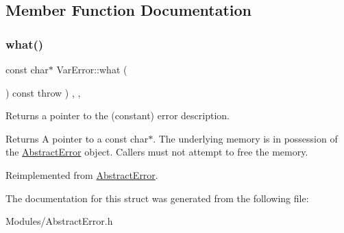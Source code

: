 \subsection{Member Function Documentation}
\mbox{\label{structVarError_a48ee904c5e61633cb6f4b9af2d093eaa}} 
\subsubsection{\texorpdfstring{what()}{what()}}
{\footnotesize\ttfamily const char$\ast$ Var\+Error\+::what (\begin{DoxyParamCaption}{ }\end{DoxyParamCaption}) const throw  ) \hspace{0.3cm}{\ttfamily [inline]}, {\ttfamily [override]}, {\ttfamily [virtual]}}

Returns a pointer to the (constant) error description. \begin{DoxyReturn}{Returns}
A pointer to a const char$\ast$. The underlying memory is in possession of the \hyperlink{classAbstractError}{Abstract\+Error} object. Callers must not attempt to free the memory. 
\end{DoxyReturn}


Reimplemented from \hyperlink{classAbstractError_a19735c7a9b5f6e84db606292967667a9}{Abstract\+Error}.



The documentation for this struct was generated from the following file\+:\begin{DoxyCompactItemize}
\item 
Modules/Abstract\+Error.\+h\end{DoxyCompactItemize}

